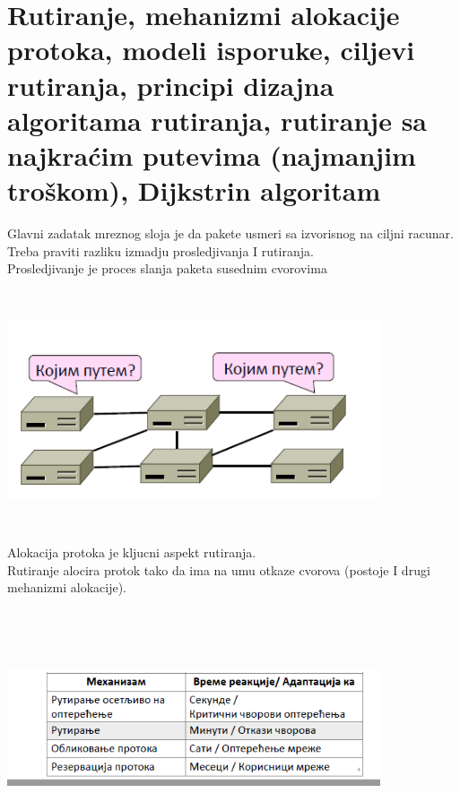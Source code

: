 \documentclass{article} %
\begin{document}
\section{Rutiranje, mehanizmi alokacije protoka, modeli isporuke, ciljevi rutiranja, principi dizajna algoritama rutiranja, rutiranje sa najkraćim putevima (najmanjim troškom), Dijkstrin algoritam}
Glavni zadatak mreznog sloja je da pakete usmeri sa izvorisnog na ciljni racunar.\\
Treba praviti razliku izmadju prosledjivanja I rutiranja.\\
Prosledjivanje je proces slanja paketa susednim cvorovima\\
\begin{center}
	\includegraphics[width=11cm, height=7cm]{rutiranje}\\
\end{center}
Alokacija protoka je kljucni aspekt rutiranja.\\
Rutiranje alocira protok tako da ima na umu otkaze cvorova (postoje I drugi mehanizmi alokacije).\\
\begin{center}
	\includegraphics[width=11cm, height=7cm]{alokacija}\\
\end{center}
\end{document}
